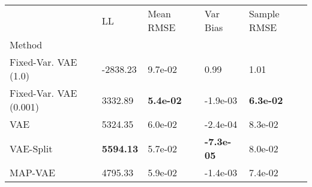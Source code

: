 \begin{tabular}{lllll}
\toprule
{} &                LL &         Mean RMSE &           Var Bias &       Sample RMSE \\
Method                 &                   &                   &                    &                   \\
\midrule
Fixed-Var. VAE (1.0)   &          -2838.23 &           9.7e-02 &               0.99 &              1.01 \\
Fixed-Var. VAE (0.001) &           3332.89 &  \textbf{5.4e-02} &           -1.9e-03 &  \textbf{6.3e-02} \\
VAE                    &           5324.35 &           6.0e-02 &           -2.4e-04 &           8.3e-02 \\
VAE-Split              &  \textbf{5594.13} &           5.7e-02 &  \textbf{-7.3e-05} &           8.0e-02 \\
MAP-VAE                &           4795.33 &           5.9e-02 &           -1.4e-03 &           7.4e-02 \\
\bottomrule
\end{tabular}

